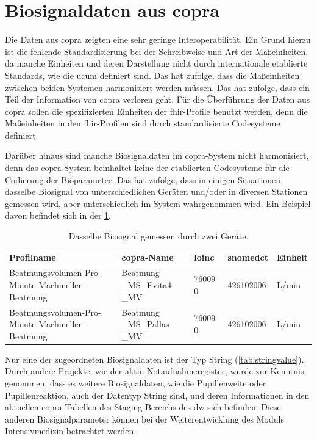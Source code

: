 \section{Biosignaldaten aus \acs{copra}} \label{sec:configvarcopradiscu}

Die Daten aus \ac{copra} zeigten eine sehr geringe Interoperabilität. Ein Grund hierzu ist die fehlende Standardisierung bei der Schreibweise und Art der Maßeinheiten, da manche Einheiten und deren Darstellung nicht durch internationale etablierte Standards, wie die \ac{ucum} definiert sind. Das hat zufolge, dass die Maßeinheiten zwischen beiden Systemen harmonisiert werden müssen. Das hat zufolge, dass ein Teil der Information von \ac{copra} verloren geht. Für die Überführung der Daten aus \ac{copra} sollen die spezifizierten Einheiten der \ac{fhir}-Profile benutzt werden, denn die Maßeinheiten in den \ac{fhir}-Profilen sind durch standardisierte Codesysteme definiert.

Darüber hinaus sind manche Biosignaldaten im \ac{copra}-System nicht harmonisiert, denn das \ac{copra}-System beinhaltet keine der etablierten Codesysteme für die Codierung der Bioparameter. Das hat zufolge, dass in einigen Situationen dasselbe Biosignal von unterschiedlichen Geräten und/oder in diversen Stationen gemessen wird, aber unterschiedlich im System wahrgenommen wird. Ein Beispiel davon befindet sich in der \ref{tab:sameprofilbiosig}.

\clearpage

 \begin{table}[ht]
 	\centering 
 	\caption[Dasselbe Biosignal gemessen durch zwei Geräte]{Dasselbe Biosignal gemessen durch zwei Geräte.}
 	\label{tab:sameprofilbiosig}
 	\begin{tabular}{|p{3.5cm}|p{2.4cm}|l|l|l|}
 		\hline
 		 \bfseries Profilname & \bfseries \ac{copra}-Name & \bfseries \acs{loinc} & \bfseries \ac{snomedct} & \bfseries Einheit \\ \hline
 		Beatmungsvolumen-Pro-Minute-Machineller-Beatmung & Beatmung \_MS\_Evita4 \_MV & 76009-0 & 426102006 & L/min \\ \hline
 		Beatmungsvolumen-Pro-Minute-Machineller-Beatmung & Beatmung \_MS\_Pallas \_MV & 76009-0 & 426102006 & L/min \\ \hline
 	\end{tabular}
 \end{table}

Nur eine der zugeordneten Biosignaldaten ist der Typ String (\ref{tab:stringvalue}). Durch andere Projekte, wie der \ac{aktin}-Notaufnahmeregister, wurde zur Kenntnis genommen, dass es weitere Biosignaldaten, wie die Pupillenweite oder Pupillenreaktion, auch der Datentyp String sind, und deren Informationen in den aktuellen \ac{copra}-Tabellen des Staging Bereichs des \ac{dw} sich befinden. Diese anderen Biosignalparameter können bei der Weiterentwicklung des Moduls \glqq Intensivmedizin\grqq{} betrachtet werden.

